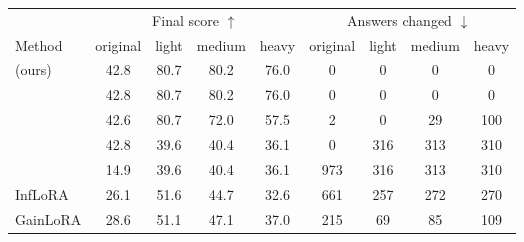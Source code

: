 \begin{tabular}{lcccccccc}
    \toprule
    & \multicolumn{4}{c}{Final score $\uparrow$} & \multicolumn{4}{c}{Answers changed $\downarrow$} \\
    \cmidrule(lr){2-5} \cmidrule(lr){6-9}
    Method & original & light & medium & heavy & original & light & medium & heavy \\
    \midrule
    \cert{} (ours) & 42.8 & 80.7 & 80.2 & 76.0 & 0 & 0 & 0 & 0 \\
    \nearest{} & 42.8 & 80.7 & 80.2 & 76.0 & 0 & 0 & 0 & 0 \\
    \centre{} & 42.6 & 80.7 & 72.0 & 57.5 & 2 & 0 & 29 & 100 \\
    \keyswitch{} & 42.8 & 39.6 & 40.4 & 36.1 & 0 & 316 & 313 & 310 \\
    \plain{} & 14.9 & 39.6 & 40.4 & 36.1 & 973 & 316 & 313 & 310 \\
    \midrule
    InfLoRA & 26.1 & 51.6 & 44.7 & 32.6 & 661 & 257 & 272 & 270 \\
    GainLoRA & 28.6 & 51.1 & 47.1 & 37.0 & 215 & 69 & 85 & 109 \\
    \bottomrule
\end{tabular}
